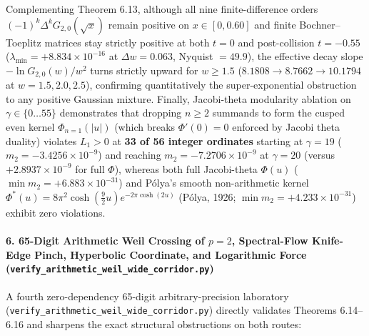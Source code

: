 \documentclass[
  11pt,
]{article}
\begin{document}
\begin{enumerate}
  Complementing Theorem 6.13, although all nine finite-difference orders
  \((-1)^k\Delta^k G_{2,0}(\sqrt{x})\) remain positive on
  \(x \in [0, 0.60]\) and finite Bochner--Toeplitz matrices stay
  strictly positive at both \(t = 0\) and post-collision \(t = -0.55\)
  (\(\lambda_{\min} = +8.834 \times 10^{-16}\) at \(\Delta w = 0.063\),
  Nyquist \(= 49.9\)), the effective decay slope \(-\ln G_{2,0}(w)/w^2\)
  turns strictly upward for \(w \ge 1.5\)
  (\(8.1808 \to 8.7662 \to 10.1794\) at \(w = 1.5, 2.0, 2.5\)),
  confirming quantitatively the super-exponential obstruction to any
  positive Gaussian mixture. Finally, Jacobi-theta modularity ablation
  on \(\gamma \in \{0 \dots 55\}\) demonstrates that dropping
  \(n \ge 2\) summands to form the cusped even kernel
  \(\Phi_{n=1}(|u|)\) (which breaks \(\Phi'(0) = 0\) enforced by Jacobi
  theta duality) violates \(L_1 > 0\) at \textbf{33 of 56 integer
  ordinates} starting at \(\gamma = 19\)
  (\(m_2 = -3.4256 \times 10^{-9}\)) and reaching
  \(m_2 = -7.2706 \times 10^{-9}\) at \(\gamma = 20\) (versus
  \(+2.8937 \times 10^{-9}\) for full \(\Phi\)), whereas both full
  Jacobi-theta \(\Phi(u)\) (\(\min m_2 = +6.883 \times 10^{-31}\)) and
  Pólya's smooth non-arithmetic kernel
  \(\Phi^*(u) = 8\pi^2\cosh(\frac{9}{2}u)e^{-2\pi\cosh(2u)}\) (Pólya,
  1926; \(\min m_2 = +4.233 \times 10^{-31}\)) exhibit zero violations.
\end{enumerate}

\paragraph{\texorpdfstring{6. 65-Digit Arithmetic Weil Crossing of
\(p = 2\), Spectral-Flow Knife-Edge Pinch, Hyperbolic Coordinate, and
Logarithmic Force
(\texttt{verify\_arithmetic\_weil\_wide\_corridor.py})}{6. 65-Digit Arithmetic Weil Crossing of p = 2, Spectral-Flow Knife-Edge Pinch, Hyperbolic Coordinate, and Logarithmic Force (verify\_arithmetic\_weil\_wide\_corridor.py)}}\label{digit-arithmetic-weil-crossing-of-p-2-spectral-flow-knife-edge-pinch-hyperbolic-coordinate-and-logarithmic-force-verify_arithmetic_weil_wide_corridor.py}

A fourth zero-dependency 65-digit arbitrary-precision laboratory
(\texttt{verify\_arithmetic\_weil\_wide\_corridor.py}) directly
validates Theorems 6.14--6.16 and sharpens the exact structural
obstructions on both routes:
\end{document}
